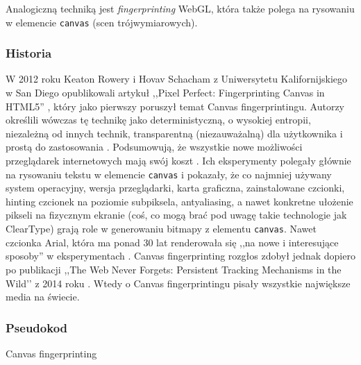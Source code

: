 Analogiczną techniką jest \emph{fingerprinting} WebGL, która także polega na
rysowaniu w elemencie \texttt{canvas} (scen trójwymiarowych).

\subsubsection{Historia}
W 2012 roku Keaton Rowery i Hovav Schacham z Uniwersytetu Kalifornijskiego w San
Diego opublikowali artykuł ,,Pixel Perfect: Fingerprinting Canvas in HTML5''
\cite{mowery2012pixel}, który jako pierwszy poruszył temat Canvas
fingerprintingu. Autorzy określili wówczas tę technikę jako deterministyczną, o
wysokiej entropii, niezależną od innych technik, transparentną (niezauważalną)
dla użytkownika i prostą do zastosowania \cite[s. 1]{mowery2012pixel}.
Podsumowują, że wszystkie nowe możliwości przeglądarek internetowych mają swój
koszt \cite[s. 3]{mowery2012pixel}. Ich eksperymenty polegały głównie na
rysowaniu tekstu w elemencie \texttt{canvas} i pokazały, że co najmniej używany
system operacyjny, wersja przeglądarki, karta graficzna, zainstalowane czcionki,
hinting czcionek na poziomie subpiksela, antyaliasing, a nawet konkretne
ułożenie pikseli na fizycznym ekranie (coś, co mogą brać pod uwagę takie
technologie jak ClearType) grają role w generowaniu bitmapy z elementu
\texttt{canvas}. Nawet czcionka Arial, która ma ponad 30 lat renderowała się
,,na nowe i interesujące sposoby'' w eksperymentach \cite[s.
6]{mowery2012pixel}. Canvas fingerprinting rozgłos zdobył jednak dopiero po
publikacji ,,The Web Never Forgets: Persistent Tracking Mechanisms in the Wild’’
z 2014 roku \cite{acar2014web}. Wtedy o Canvas fingerprintingu pisały wszystkie
największe media na świecie.

\subsubsection{Pseudokod}
\begin{algorithm}[H]
	\SetAlgoVlined
	\BlankLine
	\BlankLine
	\;
	\caption{Canvas fingerprinting}
\end{algorithm}

